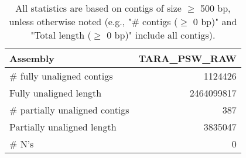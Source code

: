 \documentclass[12pt,a4paper]{article}
\begin{document}
\begin{table}[ht]
\begin{center}
\caption{All statistics are based on contigs of size $\geq$ 500 bp, unless otherwise noted (e.g., "\# contigs ($\geq$ 0 bp)" and "Total length ($\geq$ 0 bp)" include all contigs).}
\begin{tabular}{|l*{1}{|r}|}
\hline
Assembly & TARA\_PSW\_RAW \\ \hline
\# fully unaligned contigs & 1124426 \\ \hline
Fully unaligned length & 2464099817 \\ \hline
\# partially unaligned contigs & 387 \\ \hline
Partially unaligned length & 3835047 \\ \hline
\# N's & 0 \\ \hline
\end{tabular}
\end{center}
\end{table}
\end{document}
